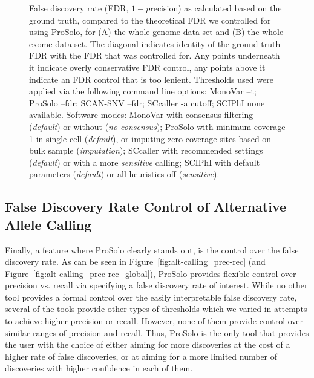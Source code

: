 \documentclass[authoryear,preprint,11pt]{scrartcl}
\begin{document}
\begin{figure}[!tpb]
\begin{minipage}[t]{.59\linewidth}
 \end{minipage}
 \caption{
 False discovery rate (FDR, $1 - p$recision) as calculated based on the ground truth, compared to the theoretical FDR we controlled for using ProSolo, for (A) the whole genome data set and (B) the whole exome data set.
 The diagonal indicates identity of the ground truth FDR with the FDR that was controlled for.
 Any points underneath it indicate overly conservative FDR control, any points above it indicate an FDR control that is too lenient.\newline \footnotesize
  Thresholds used were applied via the following command line options:
  MonoVar {\ttfamily --t};
  ProSolo {\ttfamily --fdr};
  SCAN-SNV {\ttfamily --fdr};
  SCcaller {\ttfamily -a cutoff};
  SCIPhI {\ttfamily none available}.
  Software modes:
  MonoVar with consensus filtering ({\itshape default}) or without ({\itshape no consensus});
  ProSolo with minimum coverage 1 in single cell ({\itshape default}), or imputing zero coverage sites based on bulk sample ({\itshape imputation});
  SCcaller with recommended settings ({\itshape default}) or with a more {\itshape sensitive} calling;
  SCIPhI with default parameters ({\itshape default}) or all heuristics off ({\itshape sensitive}).
 }
 \label{fig:FDR-ground-truth-vs-theoretical}
\end{figure}

\subsection{False Discovery Rate Control of Alternative Allele Calling} \label{sec:fdr-of-alt-calling}

Finally, a feature where ProSolo clearly stands out, is the control over the false discovery rate.
As can be seen in Figure~\ref{fig:alt-calling_prec-rec} (and Figure~\ref{fig:alt-calling_prec-rec_global}), ProSolo provides flexible control over precision vs. recall via specifying a false discovery rate of interest.
While no other tool provides a formal control over the easily interpretable false discovery rate, several of the tools provide other types of thresholds which we varied in attempts to achieve higher precision or recall.
However, none of them provide control over similar ranges of precision and recall.
Thus, ProSolo is the only tool that provides the user with the choice of either aiming for more discoveries at the cost of a higher rate of false discoveries, or at aiming for a more limited number of discoveries with higher confidence in each of them.
\end{document}
